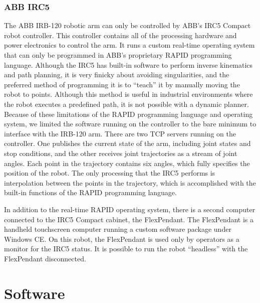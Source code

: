 \documentclass{article}
\begin{document}
\subsubsection[ABB IRC5]{ABB IRC5}
The ABB IRB-120 robotic arm can only be controlled by ABB{\textquoteright}s IRC5 Compact robot controller. This controller contains all of the processing hardware and power electronics to control the arm. It runs a custom real-time operating system that can only be programmed in ABB{\textquoteright}s proprietary RAPID programming language. Although the IRC5 has built-in software to perform inverse kinematics and path planning, it is very finicky about avoiding singularities, and the preferred method of programming it is to {\textquotedblleft}teach{\textquotedblright} it by manually moving the robot to points. Although this method is useful in industrial environments where the robot executes a predefined path, it is not possible with a dynamic planner. Because of these limitations of the RAPID programming language and operating system, we limited the software running on the controller to the bare minimum to interface with the IRB-120 arm. There are two TCP servers running on the controller. One publishes the current state of the arm, including joint states and stop conditions, and the other receives joint trajectories as a stream of joint angles. Each point in the trajectory contains six angles, which fully specifies the position of the robot. The only processing that the IRC5 performs is interpolation between the points in the trajectory, which is accomplished with the built-in functions of the RAPID programming language.

In addition to the real-time RAPID operating system, there is a second computer connected to the IRC5 Compact cabinet, the FlexPendant. The FlexPendant is a handheld touchscreen computer running a custom software package under Windows CE. On this robot, the FlexPendant is used only by operators as a monitor for the IRC5 status. It is possible to run the robot {\textquotedblleft}headless{\textquotedblright} with the FlexPendant disconnected.

\section[Software]{Software}
\end{document}
